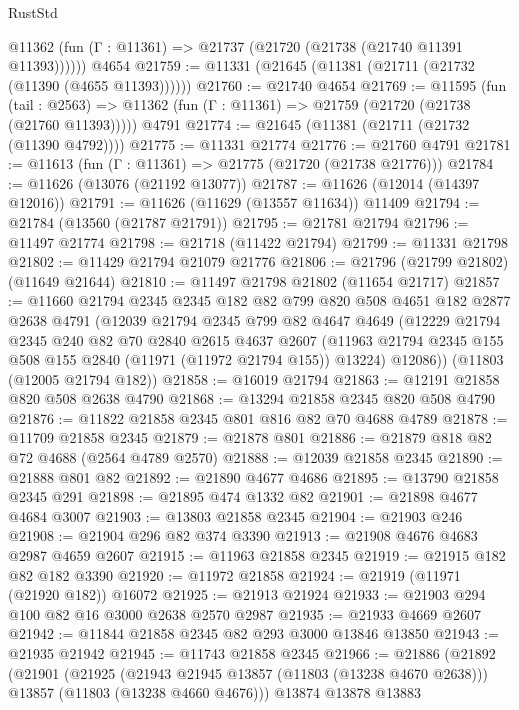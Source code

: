 \begin{lexlean}{RustStd}
\begin{coremodule}
      @11362 (fun (Γ : @11361) => @21737 (@21720 (@21738 (@21740 @11391 @11393))))))
    @4654
@21759 := @11331 (@21645 (@11381 (@21711 (@21732 (@11390 (@4655 @11393))))))
@21760 := @21740 @4654
@21769 := @11595
    (fun (tail : @2563) => @11362 (fun (Γ : @11361) => @21759 (@21720 (@21738 (@21760 @11393)))))
    @4791
@21774 := @21645 (@11381 (@21711 (@21732 (@11390 @4792))))
@21775 := @11331 @21774
@21776 := @21760 @4791
@21781 := @11613 (fun (Γ : @11361) => @21775 (@21720 (@21738 @21776)))
@21784 := @11626 (@13076 (@21192 @13077))
@21787 := @11626 (@12014 (@14397 @12016))
@21791 := @11626 (@11629 (@13557 @11634)) @11409
@21794 := @21784 (@13560 (@21787 @21791))
@21795 := @21781 @21794
@21796 := @11497 @21774
@21798 := @21718 (@11422 @21794)
@21799 := @11331 @21798
@21802 := @11429 @21794 @21079 @21776
@21806 := @21796 (@21799 @21802) (@11649 @21644)
@21810 := @11497 @21798 @21802 (@11654 @21717)
@21857 := @11660
    @21794
    @2345
    @2345
    @182
    @82
    @799
    @820
    @508
    @4651
    @182
    @2877
    @2638
    @4791
    (@12039
      @21794
      @2345
      @799
      @82
      @4647
      @4649
      (@12229
        @21794
        @2345
        @240
        @82
        @70
        @2840
        @2615
        @4637
        @2607
        (@11963 @21794 @2345 @155 @508 @155 @2840 (@11971 (@11972 @21794 @155)) @13224)
        @12086))
    (@11803 (@12005 @21794 @182))
@21858 := @16019 @21794
@21863 := @12191 @21858 @820 @508 @2638 @4790
@21868 := @13294 @21858 @2345 @820 @508 @4790
@21876 := @11822 @21858 @2345 @801 @816 @82 @70 @4688 @4789
@21878 := @11709 @21858 @2345
@21879 := @21878 @801
@21886 := @21879 @818 @82 @72 @4688 (@2564 @4789 @2570)
@21888 := @12039 @21858 @2345
@21890 := @21888 @801 @82
@21892 := @21890 @4677 @4686
@21895 := @13790 @21858 @2345 @291
@21898 := @21895 @474 @1332 @82
@21901 := @21898 @4677 @4684 @3007
@21903 := @13803 @21858 @2345
@21904 := @21903 @246
@21908 := @21904 @296 @82 @374 @3390
@21913 := @21908 @4676 @4683 @2987 @4659 @2607
@21915 := @11963 @21858 @2345
@21919 := @21915 @182 @82 @182 @3390
@21920 := @11972 @21858
@21924 := @21919 (@11971 (@21920 @182)) @16072
@21925 := @21913 @21924
@21933 := @21903 @294 @100 @82 @16 @3000 @2638 @2570 @2987
@21935 := @21933 @4669 @2607
@21942 := @11844 @21858 @2345 @82 @293 @3000 @13846 @13850
@21943 := @21935 @21942
@21945 := @11743 @21858 @2345
@21966 := @21886
    (@21892
      (@21901
        (@21925
          (@21943 @21945 @13857 (@11803 (@13238 @4670 @2638)))
          @13857
          (@11803 (@13238 @4660 @4676)))
        @13874
        @13878
        @13883

\end{coremodule}
\end{lexlean}
